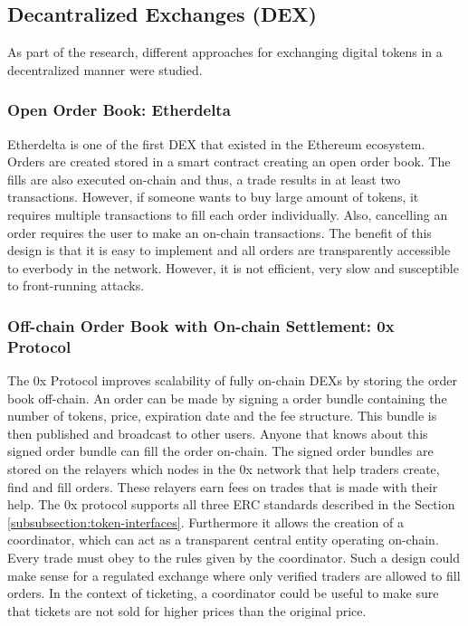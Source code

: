 \subsection{Decantralized Exchanges (DEX)}

As part of the research, different approaches for exchanging digital tokens in a decentralized manner were studied.

\subsubsection{Open Order Book: Etherdelta}
Etherdelta is one of the first DEX that existed in the Ethereum ecosystem. Orders are created stored in a smart contract creating an open order book. The fills are also executed on-chain and thus, a trade results in at least two transactions. However, if someone wants to buy large amount of tokens, it requires multiple transactions to fill each order individually. Also, cancelling an order requires the user to make an on-chain transactions. The benefit of this design is that it is easy to implement and all orders are transparently accessible to everbody in the network. However, it is not efficient, very slow and susceptible to front-running attacks. 

\subsubsection{Off-chain Order Book with On-chain Settlement: 0x Protocol}

The 0x Protocol improves scalability of fully on-chain DEXs by storing the order book off-chain. An order can be made by signing a order bundle containing the number of tokens, price, expiration date and the fee structure. This bundle is then published and broadcast to other users. Anyone that knows about this signed order bundle can fill the order on-chain. The signed order bundles are stored on the relayers which nodes in the 0x network that help traders create, find and fill orders. These relayers earn fees on trades that is made with their help. The 0x protocol supports all three ERC standards described in the Section \ref{subsubsection:token-interfaces}. Furthermore it allows the creation of a coordinator, which can act as a transparent central entity operating on-chain. Every trade must obey to the rules given by the coordinator. Such a design could make sense for a regulated exchange where only verified traders are allowed to fill orders. In the context of ticketing, a coordinator could be useful to make sure that tickets are not sold for higher prices than the original price. 

